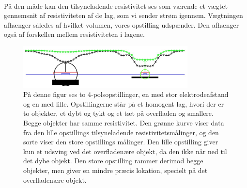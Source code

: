 \\
På den måde kan den tilsyneladende resistivitet ses som værende et vægtet gennemsnit af resistiviteten af de lag, som vi sender strøm igennem. Vægtningen afhænger således af hvilket volumen, vores opstilling udspænder. Den afhænger også af forskellen mellem resistiviteten i lagene.
\\
\begin{figure}[h!]
    \centering
    \includegraphics[width=0.8\textwidth]{Geo/Figurer/Big-small_resistivity_curve.png}
    \caption{På denne figur ses to 4-polsopstillinger, en med stor elektrodeafstand og en med lille. Opstillingerne står på et homogent lag, hvori der er to objekter, et dybt og tykt og et tæt på overfladen og smallere. Begge objekter har samme resistivitet. Den grønne kurve viser data fra den lille opstillings tilsyneladende resistivitetsmålinger, og den sorte viser den store opstillings målinger. Den lille opstilling giver kun et udsving ved det overfladenære objekt, da den ikke når ned til det dybe objekt. Den store opstilling rammer derimod begge objekter, men giver en mindre præcis lokation, specielt på det overfladenære objekt.}
    \label{fig:Big-small resistivity curve}
\end{figure}
\\ \\ \\ \\ \\ \\ \\ \\ \\
